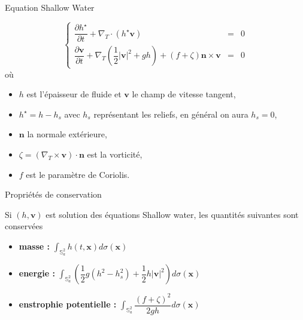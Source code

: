 \documentclass[11pt]{beamer}
\def\gint{\displaystyle\int}
\begin{document}
\begin{frame}{Equation Shallow Water}
\begin{block}{}
\begin{equation}
\left\lbrace
\begin{array}{rcl}
\dfrac{\partial h^{\star}}{\partial t} + \nabla_T \cdot \left( h^{\star} \mathbf{v} \right) & = & 0 \\
\dfrac{\partial \mathbf{v}}{\partial t} + \nabla_T \left( \dfrac{1}{2}|\mathbf{v}|^2 + gh \right) + \left( f + \zeta \right) \mathbf{n} \times \mathbf{v} & = & 0
\end{array}
\right.
\end{equation}
où  
\begin{itemize}
\item $h$ est l'épaisseur de fluide et $\mathbf{v}$ le champ de vitesse tangent,
\item $h^{\star}=h-h_s$ avec $h_s$ représentant les reliefs, en général on aura $h_s=0$,
\item $\mathbf{n}$ la normale extérieure, 
\item $\zeta = \left( \nabla_T \times \mathbf{v} \right) \cdot \mathbf{n}$ est la vorticité,
\item $f$ est le paramètre de Coriolis.
\end{itemize}
\end{block}
\end{frame}


\begin{frame}{Propriétés de conservation}
\begin{block}{}
Si $(h, \mathbf{v})$ est solution des équations Shallow water, les quantités suivantes sont conservées

\begin{itemize}
\item \textbf{masse :} 
$\gint_{\mathbb{S}^2_a} h(t, \mathbf{x}) d \sigma(\mathbf{x})$
\item \textbf{energie :}
$ \gint_{\mathbb{S}^2_a} \left( \dfrac{1}{2}g(h^2 - h_s^2) + \dfrac{1}{2} h | \mathbf{v} |^2 \right) d \sigma(\mathbf{x})$
\item \textbf{enstrophie potentielle :}
$\gint_{\mathbb{S}^2_a} \dfrac{\left( f + \zeta \right)^2}{2gh} d \sigma(\mathbf{x})$
\end{itemize}
\end{block}
\end{frame}
\end{document}
